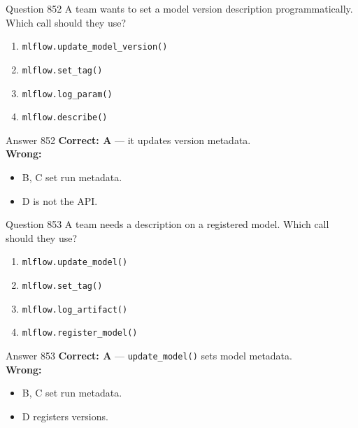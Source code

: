 \documentclass[aspectratio=169,11pt]{beamer}
\begin{document}
	\begin{frame}{Question 852}
		A team wants to set a model version description programmatically. Which call should they use?
		\begin{enumerate}[label=\Alph*.]
			\item \texttt{mlflow.update\_model\_version()}
			\item \texttt{mlflow.set\_tag()}
			\item \texttt{mlflow.log\_param()}
			\item \texttt{mlflow.describe()}
		\end{enumerate}
	\end{frame}
	\begin{frame}{Answer 852}
		\textbf{Correct: A} --- it updates version metadata.\\
		\vspace{0.5em}
		\textbf{Wrong:}
		\begin{itemize}
			\item B, C set run metadata.
			\item D is not the API.
		\end{itemize}
	\end{frame}
	
	\begin{frame}{Question 853}
		A team needs a description on a registered model. Which call should they use?
		\begin{enumerate}[label=\Alph*.]
			\item \texttt{mlflow.update\_model()}
			\item \texttt{mlflow.set\_tag()}
			\item \texttt{mlflow.log\_artifact()}
			\item \texttt{mlflow.register\_model()}
		\end{enumerate}
	\end{frame}
	\begin{frame}{Answer 853}
		\textbf{Correct: A} --- \texttt{update\_model()} sets model metadata.\\
		\vspace{0.5em}
		\textbf{Wrong:}
		\begin{itemize}
			\item B, C set run metadata.
			\item D registers versions.
		\end{itemize}
	\end{frame}
	
\end{document}
